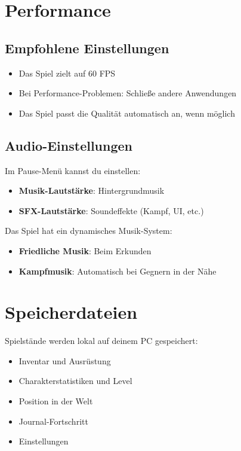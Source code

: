 \documentclass[
  a4paper,
  11pt,
  ngerman,
  parskip=half,
  bibliography=totoc,
  listof=totoc
]{scrreprt}
\begin{document}
\section{Performance}

\subsection{Empfohlene Einstellungen}

\begin{itemize}
    \item Das Spiel zielt auf 60 \ac{FPS}
    \item Bei Performance-Problemen: Schließe andere Anwendungen
    \item Das Spiel passt die Qualität automatisch an, wenn möglich
\end{itemize}

\subsection{Audio-Einstellungen}

Im Pause-Menü kannst du einstellen:
\begin{itemize}
    \item \textbf{Musik-Lautstärke}: Hintergrundmusik
    \item \textbf{SFX-Lautstärke}: Soundeffekte (Kampf, UI, etc.)
\end{itemize}

Das Spiel hat ein dynamisches Musik-System:
\begin{itemize}
    \item \textbf{Friedliche Musik}: Beim Erkunden
    \item \textbf{Kampfmusik}: Automatisch bei Gegnern in der Nähe
\end{itemize}

\section{Speicherdateien}

Spielstände werden lokal auf deinem PC gespeichert:
\begin{itemize}
    \item Inventar und Ausrüstung
    \item Charakterstatistiken und Level
    \item Position in der Welt
    \item Journal-Fortschritt
    \item Einstellungen
\end{itemize}
\end{document}
